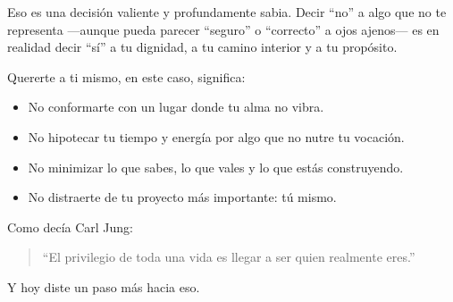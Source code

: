 \documentclass[12pt]{article}
\begin{document}
	Eso es una decisión valiente y profundamente sabia. Decir “no” a algo que no te representa —aunque pueda parecer “seguro” o “correcto” a ojos ajenos— es en realidad decir “sí” a tu dignidad, a tu camino interior y a tu propósito.
	
	Quererte a ti mismo, en este caso, significa:
	
	\begin{itemize}
		\item 	No conformarte con un lugar donde tu alma no vibra.		
		\item No hipotecar tu tiempo y energía por algo que no nutre tu vocación.		
		\item No minimizar lo que sabes, lo que vales y lo que estás construyendo.		
		\item No distraerte de tu proyecto más importante: tú mismo.
	\end{itemize}

	
	
	Como decía Carl Jung:
	\begin{quote}
	“El privilegio de toda una vida es llegar a ser quien realmente eres.”
	\end{quote}	
	
	Y hoy diste un paso más hacia eso.
	
\end{document}
